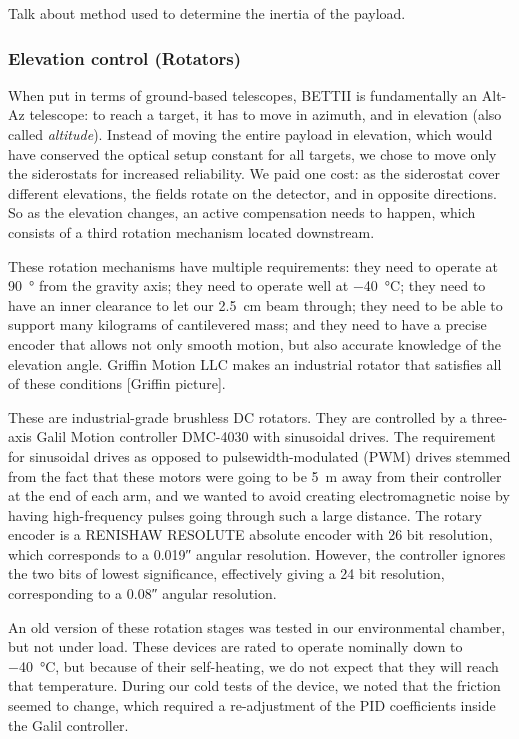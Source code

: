 Talk about method used to determine the inertia of the payload.

\subsubsection{Elevation control (Rotators)}

When put in terms of ground-based telescopes, BETTII is fundamentally an Alt-Az telescope: to reach a target, it has to move in azimuth, and in elevation (also called \textit{altitude}). Instead of moving the entire payload in elevation, which would have conserved the optical setup constant for all targets, we chose to move only the siderostats for increased reliability. We paid one cost: as the siderostat cover different elevations, the fields rotate on the detector, and in opposite directions. So as the elevation changes, an active compensation needs to happen, which consists of a third rotation mechanism located downstream.

These rotation mechanisms have multiple requirements: they need to operate at \SI{90}{\degree} from the gravity axis; they need to operate well at \SI{-40}{\celsius}; they need to have an inner clearance to let our \SI{2.5}{\cm} beam through; they need to be able to support many kilograms of cantilevered mass; and they need to have a precise encoder that allows not only smooth motion, but also accurate knowledge of the elevation angle. Griffin Motion LLC makes an industrial rotator that satisfies all of these conditions [Griffin picture].

These are industrial-grade brushless DC rotators. They are controlled by a three-axis Galil Motion controller DMC-4030 with sinusoidal drives. The requirement for sinusoidal drives as opposed to pulsewidth-modulated (PWM) drives stemmed from the fact that these motors were going to be \SI{5}{\meter} away from their controller at the end of each arm, and we wanted to avoid creating electromagnetic noise by having high-frequency pulses going through such a large distance. The rotary encoder is a RENISHAW RESOLUTE absolute encoder with 26 bit resolution, which corresponds to a \ang{;;0.019} angular resolution. However, the controller ignores the two bits of lowest significance, effectively giving a 24 bit resolution, corresponding to a \ang{;;0.08} angular resolution.

An old version of these rotation stages was tested in our environmental chamber, but not under load. These devices are rated to operate nominally down to \SI{-40}{\celsius}, but because of their self-heating, we do not expect that they will reach that temperature. During our cold tests of the device, we noted that the friction seemed to change, which required a re-adjustment of the PID coefficients inside the Galil controller. 

